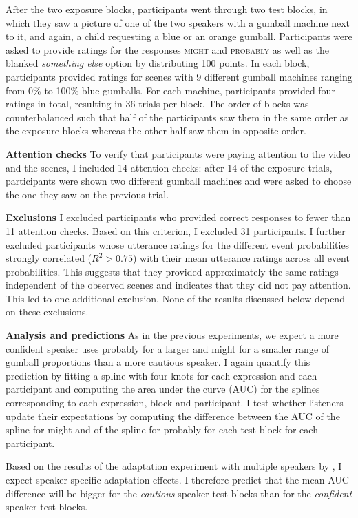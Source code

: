  After the two exposure blocks, participants went through two test blocks, in which they saw a picture of one of the two speakers with a gumball machine next to it, and again, a child requesting a blue or an orange gumball. Participants were asked to provide ratings for the responses \textsc{might} and \textsc{probably} as well as the blanked \textit{something else} option by distributing 100 points.   In each block, participants provided ratings for scenes with 9 different gumball machines ranging from 0\% to 100\% blue gumballs. For each machine, participants provided four ratings in total, resulting in 36 trials per block. The order of blocks was counterbalanced such that half of the participants saw them in the same order as the exposure blocks whereas the other half saw them in opposite order.

\noindent \textbf{Attention checks}  To verify that participants were paying attention to the video and the scenes, I included 14 attention checks: after 14 of the exposure trials, participants were shown two different gumball machines and were asked to choose the one they saw on the previous trial. 

\noindent \textbf{Exclusions} I excluded participants who provided correct responses to fewer than 11 attention checks. Based on this criterion, I excluded 31 participants. I further excluded participants whose utterance ratings for the different event probabilities strongly correlated ($R^2 > 0.75$) with their mean utterance ratings across all event probabilities. This suggests that they provided approximately the same ratings independent of the observed scenes and indicates that they did not pay attention. This led to one additional exclusion. None of the results discussed below depend on these exclusions.

\noindent \textbf{Analysis and predictions} 
As in the previous experiments, we expect a more confident speaker uses {\sc probably} for a larger and {\sc might} 
for a smaller range of gumball proportions than a more cautious speaker. I again quantify this prediction by 
fitting a spline with four knots for each 
expression and each participant and computing the area under the curve (AUC) for the splines 
corresponding to each expression, block and participant. 
I test whether listeners update their expectations by computing the difference between 
the AUC of the spline for {\sc might} and of the spline for {\sc probably} for each test block for each 
participant. 

Based on the results of the adaptation experiment with multiple speakers by \textcite{Yildirim2016},
I expect speaker-specific adaptation effects. I therefore predict that the mean AUC difference
will be bigger for the \emph{cautious} speaker test blocks than for the \emph{confident} speaker test blocks.

